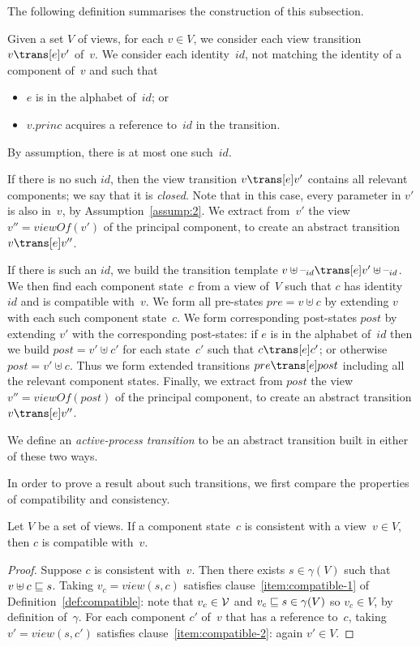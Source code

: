 The following definition summarises the construction of this subsection.
%
\begin{definition}
\label{def:active-process-transition}
Given a set $V$ of views, for each $v \in V$, we consider each view transition
$v \trans[e] v'$ of~$v$.
%
We consider each identity~$id$, not matching the identity of a component
of~$v$ and such that
%
\begin{itemize}
\item $e$ is in the alphabet of~$id$; or

\item $v.princ$ acquires a reference to~$id$ in the transition.
\end{itemize}
%
By assumption, there is at most one such~$id$.

If there is no such $id$, then the view transition $v \trans[e] v'$ contains
all relevant components; we say that it is \emph{closed}.  Note that in this
case, every parameter in $v'$ is also in~$v$, by Assumption~\ref{assump:2}.
We extract from~$v'$ the view~$v'' = viewOf(v')$ of the principal component,
to create an abstract transition $v \trans[e] v''$.

If there is such an $id$, we build the transition template $v \uplus \hole{id}
\trans[e] v' \uplus \hole{id}$.  We then find each component state~$c$ from a
view of~$V$ such that $c$ has identity~$id$ and is compatible with~$v$.  We
form all pre-states $pre = v \uplus c$ by extending $v$ with each such
component state~$c$.  We form corresponding post-states $post$ by extending
$v'$ with the corresponding post-states: if $e$ is in the alphabet of~$id$
then we build $post = v' \uplus c'$ for each state~$c'$ such that $c \trans[e]
c'$; or otherwise $post = v' \uplus c$.  Thus we form extended transitions
$pre \trans[e] post$ including all the relevant component states.  Finally, we
extract from $post$ the view~$v'' = viewOf(post)$ of the principal component,
to create an abstract transition $v \trans[e] v''$.

We define an \emph{active-process transition} to be an abstract transition
built in either of these two ways.
\end{definition}


In order to prove a result about such transitions, we first compare the
properties of compatibility and consistency.
%
\begin{lemma}
\label{lem:consistent-implies-compatible}
Let $V$ be a set of views.
If a component state~$c$ is consistent with a view~$v \in V$, then
$c$ is compatible with~$v$. 
\end{lemma}
%
\begin{proof}
Suppose $c$ is consistent with~$v$.  Then there exists $s \in \gamma(V)$ such
that $v \uplus c \sqsubseteq s$.  Taking $v_c = view(s, c)$ satisfies
clause~\ref{item:compatible-1} of Definition~\ref{def:compatible}: note that
$v_c \in \mathcal{V}$ and $v_c \sqsubseteq s \in \gamma(V)$ so $v_c \in V$, by definition
of~$\gamma$.  For each component $c'$ of~$v$ that has a reference to~$c$,
taking $v' = view(s,c')$ satisfies clause~\ref{item:compatible-2}: again $v'
\in V$.
\end{proof}

